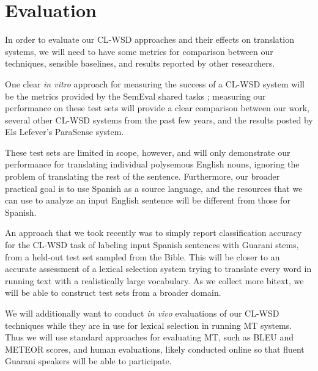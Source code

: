 \chapter{Evaluation}
\label{chap:evaluation}

In order to evaluate our CL-WSD approaches and their effects on translation
systems, we will need to have some metrics for comparison between our
techniques, sensible baselines, and results reported by other researchers.

One clear \emph{in vitro} approach for measuring the success of a CL-WSD system
will be the metrics provided by the SemEval shared tasks
\cite{lefever-hoste:2009:SEW,task10}; measuring our performance on these test
sets will provide a clear comparison between our work, several other CL-WSD
systems from the past few years, and the results posted by Els Lefever's
ParaSense system.

These test sets are limited in scope, however, and will only demonstrate our
performance for translating individual polysemous English nouns, ignoring the
problem of translating the rest of the sentence.
Furthermore, our broader practical goal is to use Spanish as a source language,
and the resources that we can use to analyze an input English sentence will be
different from those for Spanish.

An approach that we took recently \cite{rudnick-gasser:2013:HyTra-2013} was to
simply report classification accuracy for the CL-WSD task of labeling input
Spanish sentences with Guarani stems, from a held-out test set sampled from the
Bible.
This will be closer to an accurate assessment of a lexical selection system
trying to translate every word in running text with a realistically large
vocabulary. As we collect more bitext, we will be able to construct test sets
from a broader domain.

We will additionally want to conduct \emph{in vivo} evaluations of our CL-WSD
techniques while they are in use for lexical selection in running MT systems.
Thus we will use standard approaches for evaluating MT, such as BLEU and METEOR
scores, and human evaluations, likely conducted online so that fluent Guarani
speakers will be able to participate.

